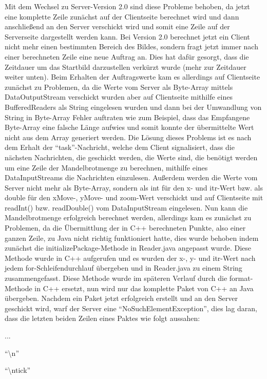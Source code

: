 \documentclass[12pt, onecolumn, notitlepage]{scrartcl}
\begin{document}
Mit dem Wechsel zu Server-Version 2.0 sind diese Probleme behoben, da jetzt eine komplette Zeile zunächst auf der Clientseite berechnet wird und dann anschließend an den Server verschickt wird und somit eine Zeile auf der Serverseite dargestellt werden kann. Bei Version 2.0 berechnet jetzt ein Client nicht mehr einen bestimmten Bereich des Bildes, sondern fragt jetzt immer nach einer berechneten Zeile eine neue Auftrag an. Dies hat dafür gesorgt, dass die Zeitdauer um das Startbild darzustellen verkürzt wurde (mehr zur Zeitdauer weiter unten). Beim Erhalten der Auftragswerte kam es allerdings auf Clientseite zunächst zu Problemen, da die Werte vom Server als Byte-Array mittels DataOutputStream verschickt wurden aber auf Clientseite mithilfe eines BufferedReaders als String eingelesen wurden und dann bei der Umwandlung von String in Byte-Array Fehler auftraten wie zum Beispiel, dass das Empfangene Byte-Array eine falsche Länge aufwies und somit konnte der übermittelte Wert nicht aus dem Array generiert werden. Die Lösung dieses Problems ist es nach dem Erhalt der \enquote{task}-Nachricht, welche dem Client signalisiert, dass die nächsten Nachrichten, die geschickt werden, die Werte sind, die benötigt werden um eine Zeile der Mandelbrotmenge zu berechnen, mithilfe eines DataInputStreams die Nachrichten einzulesen. Außerdem werden die Werte vom Server nicht mehr als Byte-Array, sondern als int für den x- und itr-Wert bzw. als double für den xMove-, yMove- und zoom-Wert verschickt und auf Clientseite mit readInt() bzw. readDouble() vom DataInputStream eingelesen. Nun kann die Mandelbrotmenge erfolgreich berechnet werden, allerdings kam es zunächst zu Problemen, da die Übermittlung der in C++ berechneten Punkte, also einer ganzen Zeile, zu Java nicht richtig funktioniert hatte, dies wurde behoben indem zunächst die initializePackage-Methode in Reader.java angepasst wurde. Diese Methode wurde in C++ aufgerufen und es wurden der x-, y- und itr-Wert nach jedem for-Schleifendurchlauf übergeben und in Reader.java zu einem String zusammengefasst. Diese Methode wurde im späteren Verlauf durch die format-Methode in C++ ersetzt, nun wird nur das komplette Paket von C++ an Java übergeben. Nachdem ein Paket jetzt erfolgreich erstellt und an den Server geschickt wird, warf der Server eine \enquote{NoSuchElementException}, dies lag daran, dass die letzten beiden Zeilen eines Paktes wie folgt aussahen: \par
... \par
\enquote{\textbackslash n} \par
\enquote{\textbackslash ntick} \\
\end{document}
